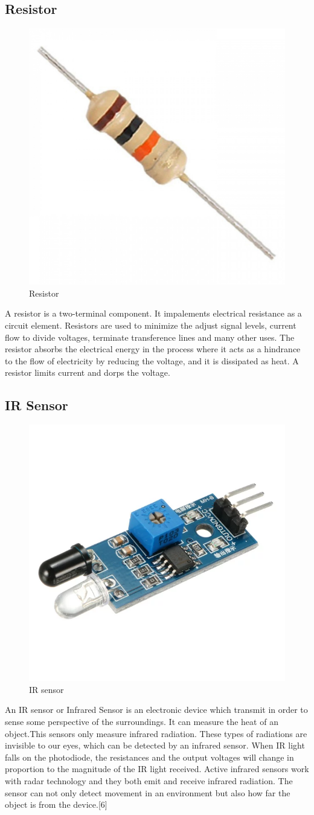 \documentclass[conference]{IEEEtran}
\begin{document}
\subsection{Resistor}
\begin{figure}
    \centering
    \includegraphics[width=0.5\linewidth]{Resistor.png}
    \caption{Resistor}
    \label{fig:enter-label}
\end{figure}
A resistor is a two-terminal component. It impalements electrical resistance as a circuit element. Resistors are used to minimize the adjust signal levels, current flow to divide voltages, terminate transference lines and many other uses. The resistor absorbs the electrical energy in the process where it acts as a hindrance to the flow of electricity by reducing the voltage, and it is dissipated as heat. A resistor limits current and dorps the voltage.

\subsection{IR Sensor}

\begin{figure}
    \centering
    \includegraphics[width=0.5\linewidth]{IR.png}
    \caption{IR sensor}
    \label{fig:enter-label}
\end{figure}
An IR sensor or Infrared Sensor is an electronic device which transmit in order to sense some perspective of the surroundings. It can measure the heat of an object.This sensors only measure infrared radiation. These types of radiations are invisible to our eyes, which can be detected by an infrared sensor. When IR light falls on the photodiode, the resistances and the output voltages will change in proportion to the magnitude of the IR light received. Active infrared sensors work with radar technology and they both emit and receive infrared radiation. The sensor can not only detect movement in an environment but also how far the object is from the device.[6]
\end{document}
